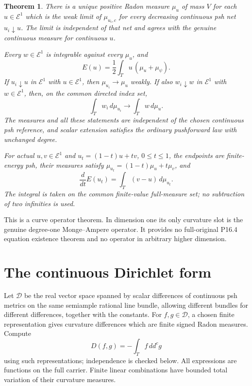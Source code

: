 \documentclass[11pt]{article}
\newtheorem{theorem}{Theorem}
\newcommand{\ddc}{dd^c}
\newcommand{\E}{\mathcal E}
\newcommand{\DF}{\mathcal D}
\begin{document}
\begin{theorem}\label{thm:main}
There is a unique positive Radon measure $\mu_u$ of mass $V$ for
each $u\in\E^1$ which is the weak limit of
$\mu_{u_i,c}$ for every decreasing continuous psh net $u_i\downarrow u$.
The limit is independent of that net and agrees with the genuine
continuous measure for continuous $u$.

Every $w\in\E^1$ is integrable against every $\mu_u$, and
\[
 E(u)=\frac12\int_Tu\,(\mu_u+\mu_\psi).
\]
If $u_i\downarrow u$ in $\E^1$ with $u\in\E^1$, then
$\mu_{u_i}\to\mu_u$ weakly. If also $w_i\downarrow w$ in $\E^1$
with $w\in\E^1$, then, on the common directed index set,
\[
 \int_T w_i\,d\mu_{u_i}\longrightarrow\int_Tw\,d\mu_u.
\]
The measures and all these statements are independent of the chosen
continuous psh reference, and scalar extension satisfies the ordinary
pushforward law with unchanged degree.

For actual $u,v\in\E^1$ and $u_t=(1-t)u+tv$, $0\leq t\leq1$,
the endpoints are finite-energy psh, their measures satisfy
$\mu_{u_t}=(1-t)\mu_u+t\mu_v$, and
\[
 \frac d{dt}E(u_t)=\int_T(v-u)\,d\mu_{u_t}.
\]
The integral is taken on the common finite-value full-measure set;
no subtraction of two infinities is used.
\end{theorem}

This is a curve operator theorem. In dimension one its only curvature
slot is the genuine degree-one Monge--Ampere operator. It provides
no full-original P16.4 equation existence theorem and no operator in
arbitrary higher dimension.

\section{The continuous Dirichlet form}

Let $\DF$ be the real vector space spanned by scalar differences of
continuous psh metrics on the same semiample rational line bundle,
allowing different bundles for different differences, together with
the constants. For $f,g\in\DF$, a chosen finite representation gives
curvature differences which are finite signed Radon measures. Compute
\[
 D(f,g)=-\int_T f\,\ddc g
\]
using such representations; independence is checked below.
All expressions are functions on the full carrier.
Finite linear combinations have bounded total variation of their
curvature measures.
\end{document}
